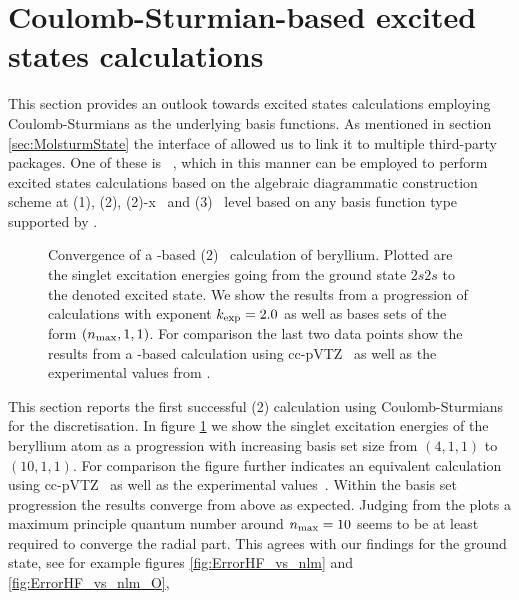 \section{Coulomb-Sturmian-based excited states calculations}
\label{sec:SturmianADC}
This section provides an outlook towards excited states calculations
employing Coulomb-Sturmians as the underlying basis functions.
As mentioned in section \vref{sec:MolsturmState} the \python interface
of \molsturm allowed us to link it to multiple third-party packages.
One of these is \adcman~\cite{Wormit2014},
which in this manner can be employed to perform excited states calculations
based on the algebraic diagrammatic construction scheme at
{\ADC}(1), {\ADC}(2), {\ADC}(2)-x~\cite{Schirmer1982}
and {\ADC}(3)~\cite{Trofimov1999} level
based on any basis function type supported by \molsturm.

\begin{figure}
	\centering
	\caption[
		Convergence of a \CS-based {\ADC}(2) calculation of beryllium
	]{
		Convergence of a \CS-based {\ADC}(2)~\cite{Schirmer1982}
		calculation of beryllium.
		Plotted are the singlet excitation energies
		going from the ground state $2s2s$ to the denoted excited state.
		We show the results from a progression
		of \CS calculations with exponent $k_\text{exp} = 2.0$
		as well as bases sets of the form $(n_\text{max}, 1, 1)$.
		For comparison the last two data points
		show the results from a \cGTO-based calculation
		using cc-pVTZ~\cite{Prascher2011}
		as well as the experimental values from \citet{Moore1949}.
	}
	\label{fig:SturmianAdcResults}
\end{figure}
This section reports the first successful {\ADC}(2)
calculation using Coulomb-Sturmians for the discretisation.
In figure \ref{fig:SturmianAdcResults} we show the singlet excitation energies
of the beryllium atom
as a progression with increasing \CS basis set size from $(4,1,1)$ to $(10,1,1)$.
For comparison the figure further indicates an equivalent calculation
using cc-pVTZ~\cite{Prascher2011} as well as the experimental values~\cite{Moore1949}.
Within the \CS basis set progression the results converge from above as expected.
Judging from the plots
a maximum principle quantum number around $n_\text{max} = 10$
seems to be at least required to converge the radial part.
This agrees with our findings for the ground state,
see for example figures \vref{fig:ErrorHF_vs_nlm} and \vref{fig:ErrorHF_vs_nlm_O},

